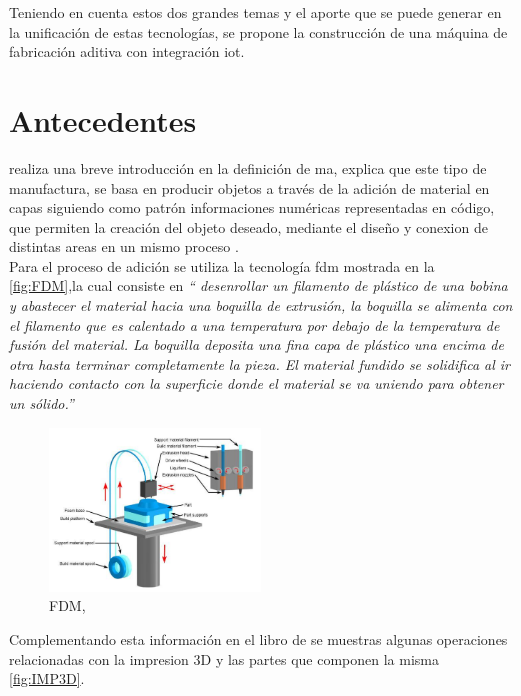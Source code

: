 Teniendo en cuenta estos dos grandes temas y el aporte que se puede generar en la unificación de estas tecnologías, se propone la construcción de una máquina  de fabricación aditiva con integración \acrshort{iot}. 




\section{Antecedentes}  \label{antecedentes}

\citep{blaquez} realiza una breve introducción en la definición de \acrshort{ma}, explica que este tipo de manufactura, se basa en producir objetos a través de la adición de material en capas siguiendo como patrón informaciones numéricas representadas en código, que permiten la creación del objeto deseado, mediante el diseño y conexion de distintas areas en un mismo proceso .\\

Para el proceso de adición se utiliza la tecnología \acrshort{fdm} mostrada en la \autoref{fig:FDM},la cual consiste en \textit{“ desenrollar un filamento de plástico de una bobina y abastecer
el material hacia una boquilla de extrusión, la boquilla se
alimenta con el filamento que es calentado a una temperatura
por debajo de la temperatura de fusión del material. La boquilla
deposita una fina capa de plástico una encima de otra hasta
terminar completamente la pieza. El material fundido se
solidifica al ir haciendo contacto con la superficie donde el
material se va uniendo para obtener un sólido.''}\citep{acuna} 

\begin{figure}[H]
    \centering
    \includegraphics[width=0.5\textwidth]{Figs/FDU.PNG}
    \caption{FDM, \citep{blaquez}}
     \label{fig:FDM}
\end{figure}

Complementando esta información en el libro de \citep{berchon} se muestras algunas operaciones relacionadas con la impresion 3D y las partes que componen la misma \autoref{fig:IMP3D}. \\

